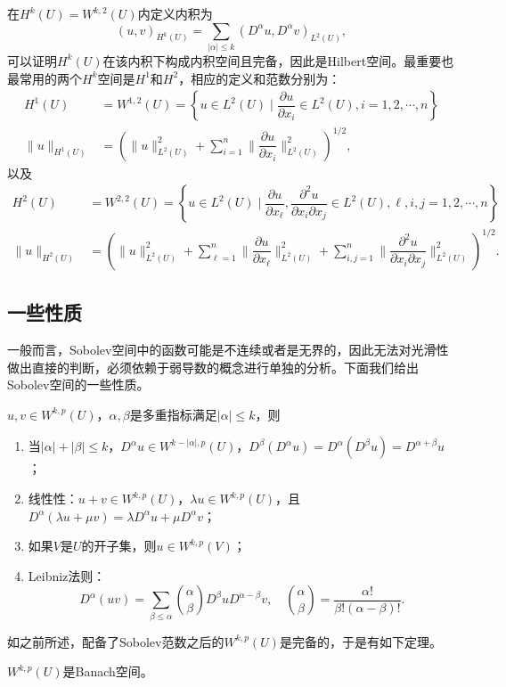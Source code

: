 \documentclass[a4paper,10pt]{ctexart}
\begin{document}
在$ H^k(U) = W^{k,2}(U) $内定义内积为
\begin{equation}
    (u,v)_{H^k(U)} = \sum_{|\alpha|\leqslant k} (D^\alpha u, D^\alpha v)_{L^2(U)},
\end{equation}
可以证明$ H^k(U) $在该内积下构成内积空间且完备，因此是Hilbert空间。最重要也最常用的两个$ H^k $空间是$ H^1 $和$ H^2 $，相应的定义和范数分别为：
\begin{equation}
    \begin{aligned}
        H^1(U) &= W^{1,2}(U) = \left\{ u\in L^2(U) \mid \dfrac{\partial u}{\partial x_i} \in L^2(U),i = 1,2,\cdots ,n \right\} \\
        \| u \|_{H^1(U)} &= \left( \| u \|_{L^2(U)}^2 + \sum_{i=1}^n \| \dfrac{\partial u}{\partial x_i} \|_{L^2(U)}^2 \right)^{1/2},
    \end{aligned}
\end{equation}
以及
\begin{equation}
    \begin{aligned}
        H^2(U) &= W^{2,2}(U) = \left\{ u\in L^2(U) \mid \dfrac{\partial u}{\partial x_\ell}, \dfrac{\partial^2 u}{\partial x_i\partial x_j} \in L^2(U),\ell,i,j = 1,2,\cdots ,n \right\} \\
        \| u \|_{H^2(U)} &= \left( \| u \|_{L^2(U)}^2 + \sum_{\ell=1}^n \| \dfrac{\partial u}{\partial x_\ell} \|^2_{L^2(U)}  + \sum_{i,j=1}^n \| \dfrac{\partial^2 u}{\partial x_i\partial x_j} \|_{L^2(U)}^2 \right)^{1/2}.
    \end{aligned}
\end{equation}

\subsection{一些性质}
一般而言，Sobolev空间中的函数可能是不连续或者是无界的，因此无法对光滑性做出直接的判断，必须依赖于弱导数的概念进行单独的分析。下面我们给出Sobolev空间的一些性质。
\begin{proposition}
    $ u,v\in W^{k,p}(U) $，$ \alpha,\beta $是多重指标满足$ |\alpha|\leqslant k $，则
    \begin{enumerate}
        \item 当$ |\alpha|+|\beta|\leqslant k $，$ D^\alpha u\in W^{k-|\alpha|,p}(U) $，$ D^\beta(D^\alpha u) = D^\alpha(D^\beta u)= D^{\alpha+\beta}u $；
        \item 线性性：$ u+v\in W^{k,p}(U) $，$ \lambda u\in W^{k,p}(U) $，且$ D^\alpha(\lambda u+\mu v) = \lambda D^\alpha u + \mu D^\alpha v $；
        \item 如果$ V $是$ U $的开子集，则$ u\in W^{k,p}(V) $；
        \item Leibniz法则：
        \[
            D^\alpha(uv) = \sum_{\beta \leqslant \alpha} \binom{\alpha}{\beta} D^\beta u D^{\alpha-\beta} v, \quad \binom{\alpha}{\beta} = \dfrac{\alpha!}{\beta!(\alpha-\beta)!}.
        \]
    \end{enumerate}
\end{proposition}
如之前所述，配备了Sobolev范数之后的$ W^{k,p}(U) $是完备的，于是有如下定理。
\begin{theorem}
    $ W^{k,p}(U) $是Banach空间。
\end{theorem}
\end{document}
